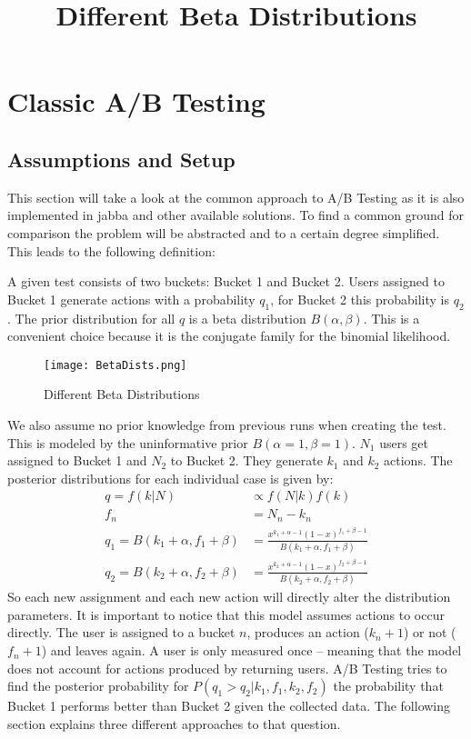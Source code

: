 \documentclass[../Thesis.tex]{subfiles}
\begin{document}
\chapter{Classic A/B Testing}

\section{Assumptions and Setup}
This section will take a look at the common approach to A/B Testing as it is also implemented in jabba and other available solutions. To find a common ground for comparison the problem will be abstracted and to a certain degree simplified. This leads to the following definition:

A given test consists of two buckets: Bucket 1 and Bucket 2. Users assigned to Bucket 1 generate actions with a probability $q_1$, for Bucket 2 this probability is $q_2$. The prior distribution for all $q$ is a beta distribution $B(\alpha,\beta)$. This is a convenient choice because it is the conjugate family for the binomial likelihood. 

\begin{figure}[h]
\texttt{[image: BetaDists.png]}
\centering
\title{Different Beta Distributions}
\caption{Different Beta Distributions}
\end{figure}

We also assume no prior knowledge from previous runs when creating the test. This is modeled by the uninformative prior $B(\alpha=1,\beta=1)$. $N_1$ users get assigned to Bucket 1 and $N_2$ to Bucket 2. They generate $k_1$ and $k_2$ actions. The posterior distributions for each individual case is given by:
\begin{align*}
q = f(k|N) &\propto f(N|k)f(k)\\
f_n &= N_n-k_n \\
q_1 = B(k_1+\alpha,f_1+\beta) & = \frac{x^{k_1+\alpha-1}(1-x)^{f_1+\beta -1}}{B(k_1+\alpha,f_1+\beta)} \\
q_2 = B(k_2+\alpha,f_2+\beta) & = \frac{x^{k_2+\alpha-1}(1-x)^{f_2+\beta -1}}{B(k_2+\alpha,f_2+\beta)}
\end{align*}
So each new assignment and each new action will directly alter the distribution parameters. It is important to notice that this model assumes actions to occur directly. The user is assigned to a bucket $n$, produces an action ($k_n + 1$) or not ($f_n + 1$) and leaves again. A user is only measured once -- meaning that the model does not account for actions produced by returning users.
A/B Testing tries to find the posterior probability for $P(q_1>q_2 | k_1,f_1,k_2,f_2)$ the probability that Bucket 1 performs better than Bucket 2 given the collected data. The following section explains three different approaches to that question.
\end{document}
